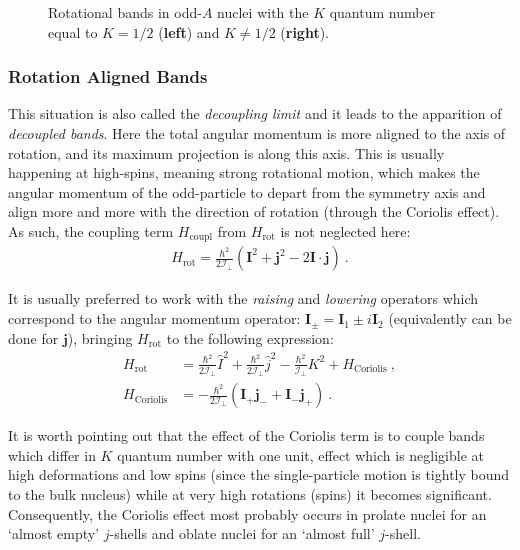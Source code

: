 \begin{figure}
    \caption{Rotational bands in odd-$A$ nuclei with the $K$ quantum number equal to $K=1/2$ (\textbf{left}) and $K\neq 1/2$ (\textbf{right}).}
    \label{rotational-bands-odd-a}
\end{figure}

\subsubsection*{Rotation Aligned Bands}

This situation is also called the \emph{decoupling limit} \cite{bohr1998nuclear} and it leads to the apparition of \emph{decoupled bands}. Here the total angular momentum is more aligned to the axis of rotation, and its maximum projection is along this axis. This is usually happening at high-spins, meaning strong rotational motion, which makes the angular momentum of the odd-particle to depart from the symmetry axis and align more and more with the direction of rotation (through the Coriolis effect). As such, the coupling term $H_\text{coupl}$ from $H_\text{rot}$ is not neglected here:
\begin{align}
    H_\text{rot}=\frac{\hbar^2}{2\mathcal{I}_\perp}\left(\mathbf{I}^2+\mathbf{j}^2-2\mathbf{I}\cdot\mathbf{j}\right)\ .
\end{align}

It is usually preferred to work with the \emph{raising} and \emph{lowering} operators which correspond to the angular momentum operator: $\mathbf{I}_\pm=\mathbf{I}_1\pm i \mathbf{I}_2$ (equivalently can be done for $\mathbf{j}$), bringing $H_\text{rot}$ to the following expression:
\begin{align}
    H_\text{rot}&=\frac{\hbar^2}{2\mathcal{I}_\perp}\hat{I}^2+\frac{\hbar^2}{2\mathcal{I}_\perp}\hat{j}^2-\frac{\hbar^2}{\mathcal{I}_\perp}K^2+H_\text{Coriolis}\ ,\\
    H_\text{Coriolis}&=-\frac{\hbar^2}{2\mathcal{I}_\perp}(\mathbf{I}_+\mathbf{j}_-+\mathbf{I}_-\mathbf{j}_+)\ .
\end{align}

It is worth pointing out that the effect of the Coriolis term is to couple bands which differ in $K$ quantum number with one unit, effect which is negligible at high deformations and low spins (since the single-particle motion is tightly bound to the bulk nucleus) while at very high rotations (spins) it becomes significant. Consequently, the Coriolis effect most probably occurs in prolate nuclei for an `almost empty' $j$-shells and oblate nuclei for an `almost full' $j$-shell.

